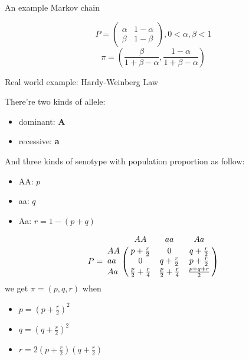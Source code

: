\documentclass[mathserif]{beamer}
\begin{document}
\begin{frame}{An example Markov chain}
	\begin{example}
		\[
		P = 
		\begin{pmatrix}
			\alpha & 1 - \alpha \\
			\beta  & 1 - \beta
		\end{pmatrix},
		0 < \alpha, \beta < 1
		\]
		\[
		\pi = \left( \frac{\beta}{1+\beta-\alpha}, \frac{1-\alpha}{1+\beta-\alpha} \right) 
		\]
	\end{example}
\end{frame}

\begin{frame}{Real world example: Hardy-Weinberg Law}
	\begin{example}
		There're two kinds of allele: 
		\begin{itemize}
			\item dominant: \textbf{A}
			\item recessive: \textbf{a}
		\end{itemize}
		And three kinds of senotype with population proportion as follow:
		\begin{itemize}
			\item AA: $p$
			\item aa: $q$
			\item Aa: $r = 1 - (p + q)$
		\end{itemize}
	\end{example}
\end{frame}

\begin{frame}
	\begin{example}[cont.]
		\[
		P = 
		\bordermatrix{ ~ & AA                      & aa                      & Aa            \cr
			            AA & p+\frac{r}{2}           & 0                       & q+\frac{r}{2} \cr
			            aa & 0                       & q+\frac{r}{2}           & p+\frac{r}{2} \cr
			            Aa & \frac{p}{2}+\frac{r}{4} & \frac{p}{2}+\frac{r}{4} & \frac{p+q+r}{2} \cr}
		\]
		we get $\pi = (p, q, r)$ when
		\begin{itemize}
			\item $p = {\left( p + \frac{r}{2} \right)}^2$
			\item $q = {\left( q + \frac{r}{2} \right)}^2$
			\item $r = 2 \left( p + \frac{r}{2} \right)\left( q + \frac{r}{2} \right)$
		\end{itemize}
	\end{example}
\end{frame}
\end{document}
